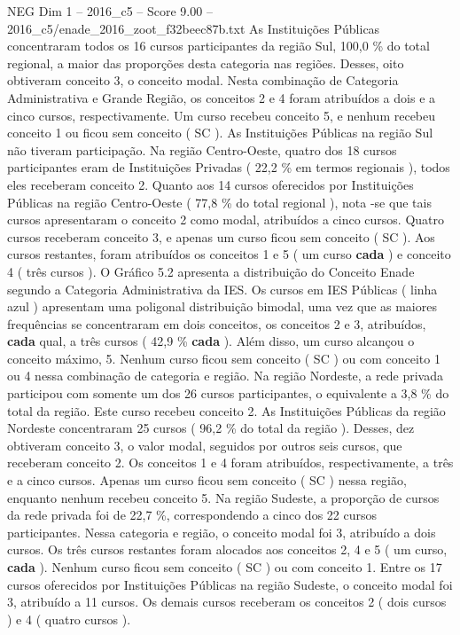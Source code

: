 \begin{textsample}{NEG Dim 1 – 2016\_c5 – Score 9.00 – 2016\_c5/enade\_2016\_zoot\_f32beec87b.txt}
As Instituições Públicas concentraram todos os 16 cursos participantes da região Sul, 100,0 \% do total regional, a maior das proporções desta categoria nas regiões.
Desses, oito obtiveram conceito 3, o conceito modal.
Nesta combinação de Categoria Administrativa e Grande Região, os conceitos 2 e 4 foram atribuídos a dois e a cinco cursos, respectivamente.
Um curso recebeu conceito 5, e nenhum recebeu conceito 1 ou ficou sem conceito ( SC ).
As Instituições Públicas na região Sul não tiveram participação.
Na região Centro-Oeste, quatro dos 18 cursos participantes eram de Instituições Privadas ( 22,2 \% em termos regionais ), todos eles receberam conceito 2.
Quanto aos 14 cursos oferecidos por Instituições Públicas na região Centro-Oeste ( 77,8 \% do total regional ), nota -se que tais cursos apresentaram o conceito 2 como modal, atribuídos a cinco cursos.
Quatro cursos receberam conceito 3, e apenas um curso ficou sem conceito ( SC ).
Aos cursos restantes, foram atribuídos os conceitos 1 e 5 ( um curso \textbf{cada} ) e conceito 4 ( três cursos ).
O Gráfico 5.2 apresenta a distribuição do Conceito Enade segundo a Categoria Administrativa da IES.
Os cursos em IES Públicas ( linha azul ) apresentam uma poligonal distribuição bimodal, uma vez que as maiores frequências se concentraram em dois conceitos, os conceitos 2 e 3, atribuídos, \textbf{cada} qual, a três cursos ( 42,9 \% \textbf{cada} ).
Além disso, um curso alcançou o conceito máximo, 5.
Nenhum curso ficou sem conceito ( SC ) ou com conceito 1 ou 4 nessa combinação de categoria e região.
Na região Nordeste, a rede privada participou com somente um dos 26 cursos participantes, o equivalente a 3,8 \% do total da região.
Este curso recebeu conceito 2.
As Instituições Públicas da região Nordeste concentraram 25 cursos ( 96,2 \% do total da região ).
Desses, dez obtiveram conceito 3, o valor modal, seguidos por outros seis cursos, que receberam conceito 2.
Os conceitos 1 e 4 foram atribuídos, respectivamente, a três e a cinco cursos.
Apenas um curso ficou sem conceito ( SC ) nessa região, enquanto nenhum recebeu conceito 5.
Na região Sudeste, a proporção de cursos da rede privada foi de 22,7 \%, correspondendo a cinco dos 22 cursos participantes.
Nessa categoria e região, o conceito modal foi 3, atribuído a dois cursos.
Os três cursos restantes foram alocados aos conceitos 2, 4 e 5 ( um curso, \textbf{cada} ).
Nenhum curso ficou sem conceito ( SC ) ou com conceito 1.
Entre os 17 cursos oferecidos por Instituições Públicas na região Sudeste, o conceito modal foi 3, atribuído a 11 cursos.
Os demais cursos receberam os conceitos 2 ( dois cursos ) e 4 ( quatro cursos ).

\end{textsample}
